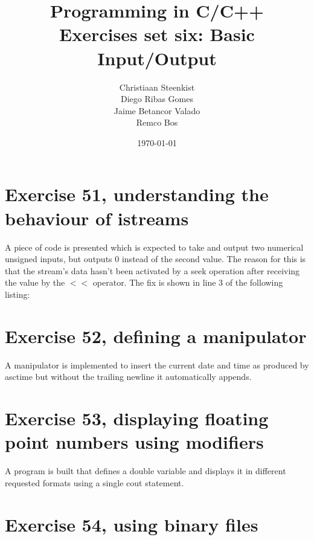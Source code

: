 \documentclass[11pt]{article}
\begin{document}
\title{Programming in C/C++ \\
       Exercises set six: Basic Input/Output
}
\date{\today}
\author{Christiaan Steenkist \\
Diego Ribas Gomes \\
Jaime Betancor Valado \\
Remco Bos \\
}

\maketitle

\section*{Exercise 51, understanding the behaviour of istreams}

A piece of code is presented which is expected to take and output two numerical unsigned inputs, but outputs 0 instead of the second value. The reason for this is that the stream's data hasn't been activated by a seek operation after receiving the value by the $<$$<$ operator.
The fix is shown in line 3 of the following listing:




\section*{Exercise 52, defining a manipulator}

A manipulator is implemented to insert the current date and time as produced by asctime but without the trailing newline it automatically appends.



\section*{Exercise 53, displaying floating point numbers using modifiers}

A program is built that defines a double variable and displays it in different requested formats using a single cout statement.



\section*{Exercise 54, using binary files}
\end{document}
